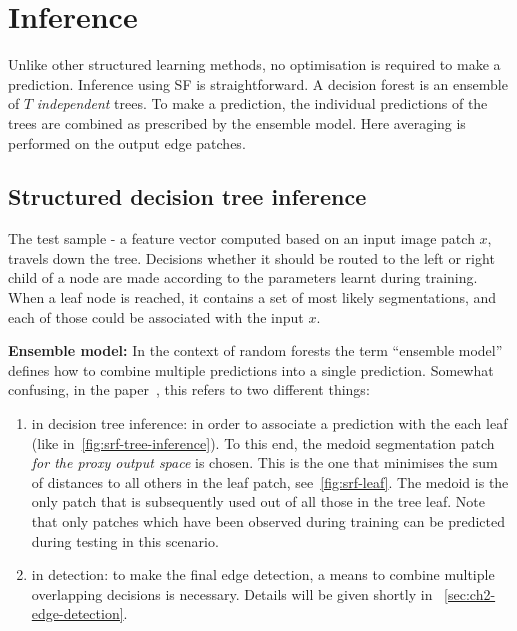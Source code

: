 \section{Inference}
Unlike other structured learning methods, no optimisation is required to make a prediction. Inference using SF is straightforward. A decision forest is an ensemble of $T$ \textit{independent} trees. To make a prediction, the individual predictions of the trees are combined as prescribed by the ensemble model. Here averaging is performed on the output edge patches.

\subsection{Structured decision tree inference}
The test sample - a feature vector computed based on an input image patch $x$, travels down the tree. Decisions whether it should be routed to the left or right child of a node are made according to the parameters learnt during training. When a leaf node is reached, it contains a set of most likely segmentations, and each of those could be associated with the input $x$.

\textbf{Ensemble model:} In the context of random forests the term ``ensemble model'' defines how to combine multiple predictions into a single prediction. Somewhat confusing, in the paper~\cite{DollarICCV13edges}, this refers to two different things:
\begin{enumerate}
 \item{in decision tree inference:} in order to associate a prediction with the each leaf (like in~\ref{fig:srf-tree-inference}). To this end, the medoid segmentation patch \textit{for the proxy output space} is chosen. This is the one that minimises the sum of distances to all others in the leaf patch, see~\ref{fig:srf-leaf}. The medoid is the only patch that is subsequently used out of all those in the tree leaf. Note that only patches which have been observed during training can be predicted during testing %
 in this scenario.
 \item{in detection:} to make the final edge detection, a means to combine multiple overlapping decisions is necessary. Details will be given shortly in \textsection~\ref{sec:ch2-edge-detection}.
\end{enumerate}

